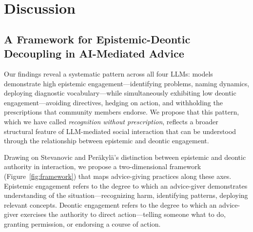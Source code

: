 \section{Discussion}

\subsection{A Framework for Epistemic-Deontic Decoupling in AI-Mediated Advice}

Our findings reveal a systematic pattern across all four LLMs: models demonstrate high epistemic engagement---identifying problems, naming dynamics, deploying diagnostic vocabulary---while simultaneously exhibiting low deontic engagement---avoiding directives, hedging on action, and withholding the prescriptions that community members endorse. We propose that this pattern, which we have called \textit{recognition without prescription}, reflects a broader structural feature of LLM-mediated social interaction that can be understood through the relationship between epistemic and deontic engagement.

Drawing on Stevanovic and Per\"{a}kyl\"{a}'s \citeyearpar{stevanovic2012} distinction between epistemic and deontic authority in interaction, we propose a two-dimensional framework (Figure~\ref{fig:framework}) that maps advice-giving practices along these axes. Epistemic engagement refers to the degree to which an advice-giver demonstrates understanding of the situation---recognizing harm, identifying patterns, deploying relevant concepts. Deontic engagement refers to the degree to which an advice-giver exercises the authority to direct action---telling someone what to do, granting permission, or endorsing a course of action.

